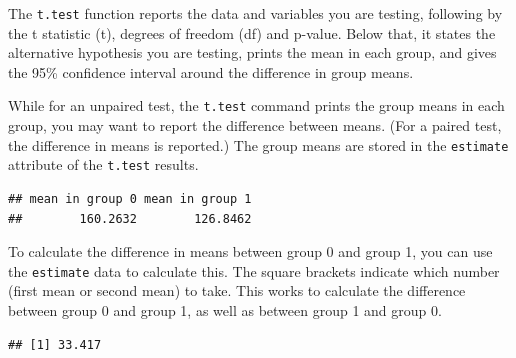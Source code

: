 \documentclass[]{book}
\newenvironment{Shaded}{\begin{snugshade}}{\end{snugshade}}
\newcommand{\DataTypeTok}[1]{\textcolor[rgb]{0.13,0.29,0.53}{#1}}
\newcommand{\DecValTok}[1]{\textcolor[rgb]{0.00,0.00,0.81}{#1}}
\newcommand{\KeywordTok}[1]{\textcolor[rgb]{0.13,0.29,0.53}{\textbf{#1}}}
\newcommand{\NormalTok}[1]{#1}
\newcommand{\OperatorTok}[1]{\textcolor[rgb]{0.81,0.36,0.00}{\textbf{#1}}}
\newcommand{\OtherTok}[1]{\textcolor[rgb]{0.56,0.35,0.01}{#1}}
\newcommand{\StringTok}[1]{\textcolor[rgb]{0.31,0.60,0.02}{#1}}
\begin{document}
The \texttt{t.test} function reports the data and variables you are testing, following by the t statistic (t), degrees of freedom (df) and p-value. Below that, it states the alternative hypothesis you are testing, prints the mean in each group, and gives the 95\% confidence interval around the difference in group means.

While for an unpaired test, the \texttt{t.test} command prints the group means in each group, you may want to report the difference between means. (For a paired test, the difference in means is reported.) The group means are stored in the \texttt{estimate} attribute of the \texttt{t.test} results.

\begin{Shaded}
\end{Shaded}

\begin{verbatim}
## mean in group 0 mean in group 1 
##        160.2632        126.8462
\end{verbatim}

To calculate the difference in means between group 0 and group 1, you can use the \texttt{estimate} data to calculate this. The square brackets indicate which number (first mean or second mean) to take. This works to calculate the difference between group 0 and group 1, as well as between group 1 and group 0.

\begin{Shaded}
\end{Shaded}

\begin{verbatim}
## [1] 33.417
\end{verbatim}

\begin{Shaded}
\end{Shaded}
\end{document}
